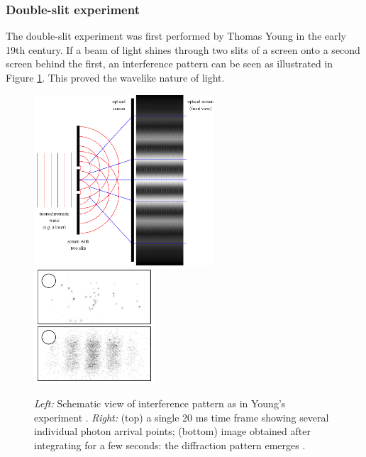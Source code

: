 \subsubsection{Double-slit experiment}
The double-slit experiment was first performed by Thomas Young in the early 19th century. If a beam of light shines through two slits of a screen onto a second screen behind the first, an interference pattern can be seen as illustrated in Figure \ref{fig:doubleslit}. This proved the wavelike nature of light.

\begin{figure}
\includegraphics[width=0.6\textwidth,height=0.5\linewidth]{chapter1/img/younginterference.png}
\includegraphics[width=0.4\textwidth,height=0.5\linewidth]{chapter1/img/doubleslitsinglephoton_crop.png}
\caption{\textit{Left:} Schematic view of interference pattern as in Young's experiment \cite{shmoop}.  \textit{Right:} (top) a single 20 ms time frame showing several individual photon arrival points; (bottom) image obtained after integrating for a few seconds: the diffraction pattern emerges \cite{weiswynands:2003}. }
\label{fig:doubleslit}
\end{figure}

